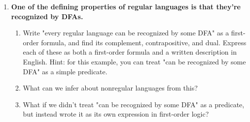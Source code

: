 \begin{enumerate}
\newpage
\item \textbf{One of the defining properties of regular languages is that they're recognized by DFAs.}
\begin{enumerate}
  \item Write "every regular language can be recognized by some DFA" as a first-order formula, and find its complement, contrapositive, and dual. Express each of these as both a first-order formula and a written description in English. Hint: for this example, you can treat "can be recognized by some DFA" as a simple predicate.
  \item What can we infer about nonregular languages from this?
  \item What if we didn't treat "can be recognized by some DFA" as a predicate, but instead wrote it as its own expression in first-order logic?
\end{enumerate}
		
\end{enumerate}


